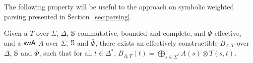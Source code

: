       
      
      
\noindent
The following property will be useful to the approach on 
symbolic weighted parsing presented in Section~\ref{sec:parsing}.

\begin{proposition} \label{prop:epsilon}
Given a \SWT $T$ over $\Sigma$, $\Delta$, 
$\mathbb{S}$ commutative, bounded and complete,
and $\bar\Phi$ effective,
and a $\textsf{swA}$ $A$ over $\Sigma$, $\mathbb{S}$ and $\bar\Phi$,
there exists an effectively constructible \SWA 
$B_{A, T}$ over $\Delta$, $\mathbb{S}$ and $\bar\Phi$,
such that for all $t \in \Delta^*$, 
$B_{A, T}(t) = \displaystyle\bigoplus_{s\in \Sigma^*} A(s) \otimes T(s, t)$.
\end{proposition}
%
